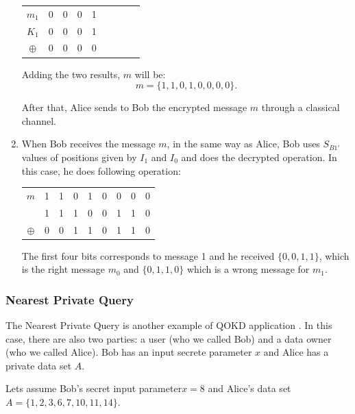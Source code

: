 \begin{enumerate}
   \begin{table}[H]
    \centering
    \begin{tabular}{c|c c c c c c c c}
     $m_{1}$ & 0 & 0 & 0 & 1 \\
     $K_{1}$ & 0 & 0 & 0 & 1 \\ \hline
     $\oplus$ & 0 & 0 & 0 & 0
    \end{tabular}
    \end{table}

    Adding the two results, $m$ will be: $$m=\{1,1,0,1,0,0,0,0\}.$$

   After that, Alice sends to Bob the encrypted message $m$ through a classical channel.

  \item When Bob receives the message $m$, in the same way as Alice, Bob uses $S_{B1\prime}$ values of positions given by $I_{1}$ and $I_{0}$ and does the decrypted operation. In this case, he does following operation:

      \begin{table}[H]
        \centering
        \begin{tabular}{c|c c c c c c c c}
         $m$ & 1 & 1 & 0 & 1 & 0 & 0 & 0 & 0 \\
             & 1 & 1 & 1 & 0 & 0 & 1 & 1 & 0 \\ \hline
         $\oplus$ & 0 & 0 & 1 & 1 & 0 & 1 & 1 & 0 \\
        \end{tabular}
        \end{table}

      The first four bits corresponds to message 1 and he received $\{0,0,1,1\}$, which is the right message $m_{0}$ and $\{0,1,1,0\}$ which is a wrong message for $m_{1}$.


\end{enumerate}

\subsubsection{Nearest Private Query}

The Nearest Private Query is another example of QOKD application \cite{Xu2017}. In this case, there are also two parties: a user (who we called Bob) and a data owner (who we called Alice). Bob has an input secrete parameter $x$ and Alice has a private data set $A$.

Lets assume Bob's secret input parameter$x=8$ and Alice's data set $A = \{ 1,2,3,6,7,10,11,14\}$.

